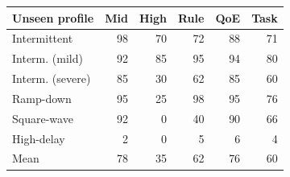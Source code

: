 \begin{tabular}{lrrrrr}
\hline
Unseen profile & Mid & High & Rule & QoE & Task \\
\hline
Intermittent & 98 & 70 & 72 & 88 & 71 \\
Interm. (mild) & 92 & 85 & 95 & 94 & 80 \\
Interm. (severe) & 85 & 30 & 62 & 85 & 60 \\
Ramp-down & 95 & 25 & 98 & 95 & 76 \\
Square-wave & 92 & 0 & 40 & 90 & 66 \\
High-delay & 2 & 0 & 5 & 6 & 4 \\
\hline
Mean & 78 & 35 & 62 & 76 & 60 \\
\hline
\end{tabular}
